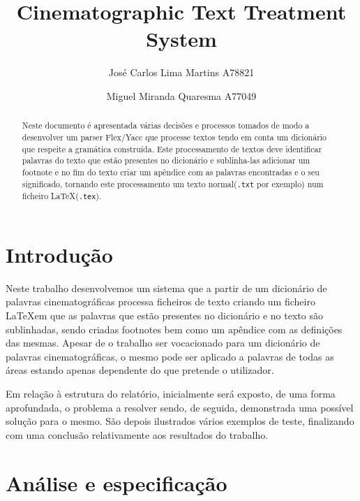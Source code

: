 \documentclass{llncs}
\begin{document}
 \mainmatter
\title{Cinematographic Text Treatment System}
\author{José Carlos Lima Martins A78821 \and
        Miguel Miranda Quaresma A77049}

\maketitle

\justify

\begin{abstract}
Neste documento é apresentada várias decisões e processos tomados de modo a desenvolver um parser Flex/Yacc que processe textos tendo em conta um dicionário que respeite a gramática construída. Este processamento de textos deve identificar palavras do texto que estão presentes no dicionário e sublinha-las adicionar um footnote e no fim do texto criar um apêndice com as palavras encontradas e o seu significado, tornando este processamento um texto normal(\verb|.txt| por exemplo) num ficheiro \LaTeX(\verb|.tex|).
\end{abstract}

\section{Introdução}
Neste trabalho desenvolvemos um sistema que a partir de um dicionário de palavras cinematográficas processa ficheiros de texto criando um ficheiro \LaTeX em que as palavras que estão presentes no dicionário e no texto são sublinhadas, sendo criadas footnotes bem como um apêndice com as definições das mesmas. Apesar de o trabalho ser vocacionado para um dicionário de palavras cinematográficas, o mesmo pode ser aplicado a palavras de todas as áreas estando apenas dependente do que pretende o utilizador.

Em relação à estrutura do relatório, inicialmente será exposto, de uma forma aprofundada, o problema a resolver sendo, de seguida, demonstrada uma possível solução para o mesmo. São depois ilustrados vários exemplos de teste, finalizando com uma conclusão relativamente aos resultados do trabalho.

\section{Análise e especificação}
\end{document}
